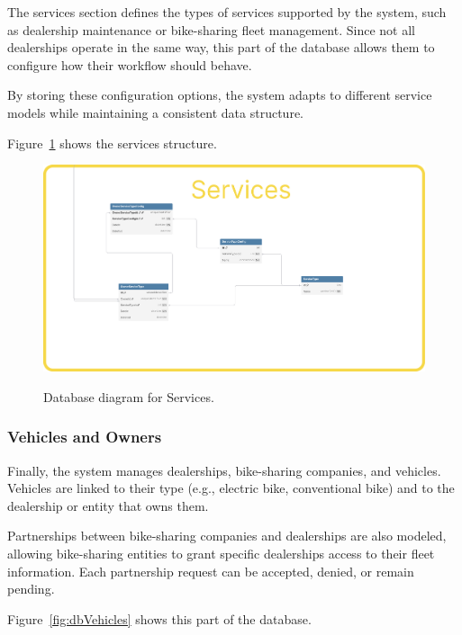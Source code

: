 The services section defines the types of services supported by the system, such as dealership maintenance or bike-sharing fleet management. Since not all dealerships operate in the same way, this part of the database allows them to configure how their workflow should behave.

By storing these configuration options, the system adapts to different service models while maintaining a consistent data structure.

Figure~\ref{fig:dbServices} shows the services structure.

\begin{figure}[h]
  \caption{Database diagram for Services.}
  \centering
  \includegraphics[width=\textwidth]{figs/dbDiagrams/Services}
  \label{fig:dbServices}
\end{figure}


\subsubsection{Vehicles and Owners} 


Finally, the system manages dealerships, bike-sharing companies, and vehicles. Vehicles are linked to their type (e.g., electric bike, conventional bike) and to the dealership or entity that owns them.

Partnerships between bike-sharing companies and dealerships are also modeled, allowing bike-sharing entities to grant specific dealerships access to their fleet information. Each partnership request can be accepted, denied, or remain pending.

Figure~\ref{fig:dbVehicles} shows this part of the database.

